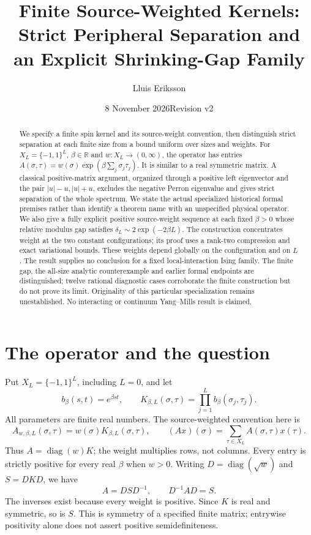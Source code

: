 \documentclass[11pt]{article}
\title{Finite Source-Weighted Kernels:\\Strict Peripheral Separation and an Explicit Shrinking-Gap Family}
\author{Lluis Eriksson}
\date{8 November 2026\quad Revision v2}
\newcommand{\R}{\mathbb R}\newcommand{\C}{\mathbb C}\newcommand{\N}{\mathbb N}
\begin{document}
\maketitle
\begin{abstract}
We specify a finite spin kernel and its source-weight convention, then distinguish
strict separation at each finite size from a bound uniform over sizes and weights.
For $X_L=\{-1,1\}^L$, $\beta\in\R$ and $w:X_L\to(0,\infty)$, the operator has
entries $A(\sigma,\tau)=w(\sigma)\exp(\beta\sum_j\sigma_j\tau_j)$.
It is similar to a real symmetric matrix. A classical positive-matrix argument,
organized through a positive left eigenvector and the pair $|u|-u,|u|+u$,
excludes the negative Perron eigenvalue and gives strict separation of the whole
spectrum. We state the actual specialized historical formal premises rather
than identify a theorem name with an unspecified physical operator.
We also give a fully explicit positive source-weight sequence at each fixed
$\beta>0$ whose relative modulus gap satisfies
$\delta_L\sim2\exp(-2\beta L)$. The construction concentrates weight at the two
constant configurations; its proof uses a rank-two compression and exact
variational bounds. These weights depend globally on the configuration and on
$L$. The result supplies no conclusion for a fixed local-interaction Ising
family. The finite gap, the all-size analytic counterexample and earlier formal
endpoints are distinguished; twelve rational diagnostic cases corroborate the
finite construction but do not prove its limit. Originality of this particular
specialization remains unestablished. No interacting or continuum Yang--Mills
result is claimed.
\end{abstract}

\section{The operator and the question}
Put $X_L=\{-1,1\}^L$, including $L=0$, and let
\[
 b_\beta(s,t)=e^{\beta st},\qquad
 K_{\beta,L}(\sigma,\tau)=\prod_{j=1}^L b_\beta(\sigma_j,\tau_j).
\]
All parameters are finite real numbers. The source-weighted convention here is
\begin{equation}\label{eq:A}
 A_{w,\beta,L}(\sigma,\tau)=w(\sigma)K_{\beta,L}(\sigma,\tau),\qquad
 (Ax)(\sigma)=\sum_{\tau\in X_L}A(\sigma,\tau)x(\tau).
\end{equation}
Thus $A=\operatorname{diag}(w)K$; the weight multiplies rows, not columns.
Every entry is strictly positive for every real $\beta$ when $w>0$.
Writing $D=\operatorname{diag}(\sqrt w)$ and $S=DKD$, we have
\begin{equation}\label{eq:similar}
 A=DSD^{-1},\qquad D^{-1}AD=S.
\end{equation}
The inverses exist because every weight is positive. Since $K$ is real and
symmetric, so is $S$. This is symmetry of a specified finite matrix; entrywise
positivity alone does not assert positive semidefiniteness.
\end{document}
